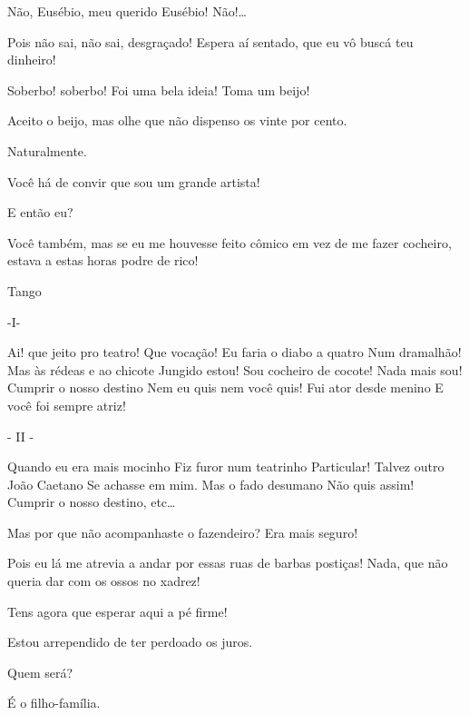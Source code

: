   Não, Eusébio, meu querido Eusébio! Não!\ldots{}

  Pois não sai, não sai, desgraçado!
 Espera aí sentado, que eu vô buscá teu
dinheiro! 


 Soberbo! soberbo! Foi uma bela ideia! Toma um beijo! 

 Aceito o beijo, mas olhe que não dispenso os vinte por cento.

 Naturalmente.

 Você há de convir que sou um grande artista!

 E então eu?

 Você também, mas se eu me houvesse feito cômico em vez de me
fazer cocheiro, estava a estas horas podre de rico!

 Tango

 -I-

 Ai! que jeito pro teatro!
 Que vocação!
 Eu faria o diabo a quatro
 Num dramalhão!
 Mas às rédeas e ao chicote
 Jungido estou!
 Sou cocheiro de cocote!
 Nada mais sou!
 Cumprir o nosso destino
 Nem eu quis nem você quis!
 Fui ator desde menino
 E você foi sempre atriz!

 - II -

 Quando eu era mais mocinho
 Fiz furor num teatrinho
 Particular!
 Talvez outro João Caetano
 Se achasse em mim.
 Mas o fado desumano
 Não quis assim!
 Cumprir o nosso destino, etc\ldots{}

 Mas por que não acompanhaste o fazendeiro? Era mais seguro!

 Pois eu lá me atrevia a andar por essas ruas de barbas postiças!
Nada, que não queria dar com os ossos no xadrez!

 Tens agora que esperar aqui a pé firme!

 Estou arrependido de ter perdoado os juros. 

 Quem será?

  É o filho-família.


